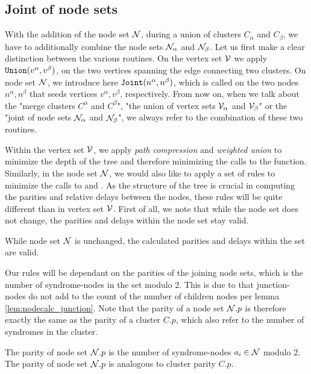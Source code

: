 \subsection{Joint of node sets}\label{sec:jointnodesets}
With the addition of the node set $\mathcal{N}$, during a union of clusters $C_\alpha$ and $C_\beta$, we have to additionally combine the node sets $\mathcal{N}_{\alpha}$ and $\mathcal{N}_\beta$. Let us first make a clear distinction between the various routines. On the vertex set $\mathcal{V}$ we apply $\texttt{Union}(v^\alpha, v^\beta)$, on the two vertices spanning the edge connecting two clusters. On node set $\mathcal{N}$, we introduce here $\texttt{Joint}(n^\alpha, n^\beta)$, which is called on the two nodes $n^\alpha, n^\beta$ that seeds vertices $v^\alpha, v^\beta$, respectively. From now on, when we talk about the "merge clusters $C^\alpha$ and $C^\beta$", "the union of vertex sets $\mathcal{V}_\alpha$ and $\mathcal{V}_\beta$" or the "joint of node sets $\mathcal{N}_{\alpha}$ and $\mathcal{N}_\beta$", we always refer to the combination of these two routines.

Within the vertex set $\mathcal{V}$, we apply \emph{path compression} and \emph{weighted union} to minimize the depth of the tree and therefore minimizing the calls to the  function. Similarly, in the node set $\mathcal{N}$, we would also like to apply a set of rules to minimize the calls to  and . As the structure of the tree is crucial in computing the parities and relative delays between the nodes, these rules will be quite different than in vertex set $\mathcal{V}$. First of all, we note that while the node set does not change, the parities and delays within the node set stay valid.


\begin{lemma}\label{lem:nodesetunchanged}
  While node set $\mathcal{N}$ is unchanged, the calculated parities and delays within the set are valid.
\end{lemma}

Our rules will be dependant on the parities of the joining node sets, which is the number of syndrome-nodes in the set modulo 2. This is due to that junction-nodes do not add to the count of the number of children nodes per lemma \ref{lem:nodecalc_junction}. Note that the parity of a node set $\mathcal{N}.p$ is therefore exactly the same as the parity of a cluster $C.p$, which also refer to the number of syndromes in the cluster.

\begin{lemma}
  The parity of node set $\mathcal{N}.p$ is the number of syndrome-nodes $a_i \in \mathcal{N}$ modulo 2. The parity of node set $\mathcal{N}.p$ is analogous to cluster parity $C.p$.
\end{lemma}

